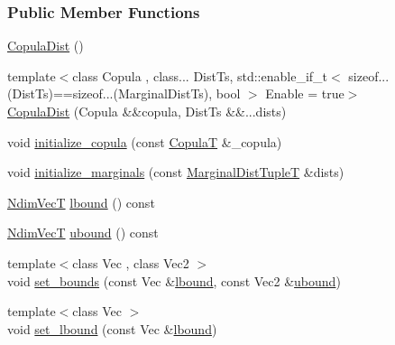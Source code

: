 \subsubsection*{Public Member Functions}
\begin{DoxyCompactItemize}
\item 
\hyperlink{classprior__hessian_1_1CopulaDistImpl_1_1CopulaDist_ac77b528427c1e073e24db35b00790983}{Copula\+Dist} ()
\item 
{\footnotesize template$<$class Copula , class... Dist\+Ts, std\+::enable\+\_\+if\+\_\+t$<$ sizeof...(\+Dist\+Ts)==sizeof...(\+Marginal\+Dist\+Ts), bool $>$ Enable = true$>$ }\\\hyperlink{classprior__hessian_1_1CopulaDistImpl_1_1CopulaDist_a65c4d1fa447c2b40b3b12e04aeaff596}{Copula\+Dist} (Copula \&\&copula, Dist\+Ts \&\&...dists)
\item 
void \hyperlink{classprior__hessian_1_1CopulaDistImpl_1_1CopulaDist_ae565171062d170680b6a107add0fc287}{initialize\+\_\+copula} (const \hyperlink{classprior__hessian_1_1CopulaDistImpl_1_1CopulaDist_a5525f8d14c3a1b3caf2f09d0e86a650f}{CopulaT} \&\+\_\+copula)
\item 
void \hyperlink{classprior__hessian_1_1CopulaDistImpl_1_1CopulaDist_a48d0317eb851b464c87d2210e9eaaf62}{initialize\+\_\+marginals} (const \hyperlink{classprior__hessian_1_1CopulaDistImpl_1_1CopulaDist_acf46fae43d481ed82a2147433e5f2ff6}{Marginal\+Dist\+TupleT} \&dists)
\item 
\hyperlink{classprior__hessian_1_1CopulaDistImpl_1_1CopulaDist_a94fa53fddcc81dcefec387f68294472d}{Ndim\+VecT} \hyperlink{classprior__hessian_1_1CopulaDistImpl_1_1CopulaDist_a4b7bf2f72c81574d9e19a2cd629f264d}{lbound} () const 
\item 
\hyperlink{classprior__hessian_1_1CopulaDistImpl_1_1CopulaDist_a94fa53fddcc81dcefec387f68294472d}{Ndim\+VecT} \hyperlink{classprior__hessian_1_1CopulaDistImpl_1_1CopulaDist_abdb39f0c5f7f5f4b16bf501e6083d5b6}{ubound} () const 
\item 
{\footnotesize template$<$class Vec , class Vec2 $>$ }\\void \hyperlink{classprior__hessian_1_1CopulaDistImpl_1_1CopulaDist_ad5f8f42efd9f709625cf60836fa473b9}{set\+\_\+bounds} (const Vec \&\hyperlink{classprior__hessian_1_1CopulaDistImpl_1_1CopulaDist_a4b7bf2f72c81574d9e19a2cd629f264d}{lbound}, const Vec2 \&\hyperlink{classprior__hessian_1_1CopulaDistImpl_1_1CopulaDist_abdb39f0c5f7f5f4b16bf501e6083d5b6}{ubound})
\item 
{\footnotesize template$<$class Vec $>$ }\\void \hyperlink{classprior__hessian_1_1CopulaDistImpl_1_1CopulaDist_ac0819ccaeef1afd7a123338823e8fb3c}{set\+\_\+lbound} (const Vec \&\hyperlink{classprior__hessian_1_1CopulaDistImpl_1_1CopulaDist_a4b7bf2f72c81574d9e19a2cd629f264d}{lbound})

\end{DoxyCompactItemize}
